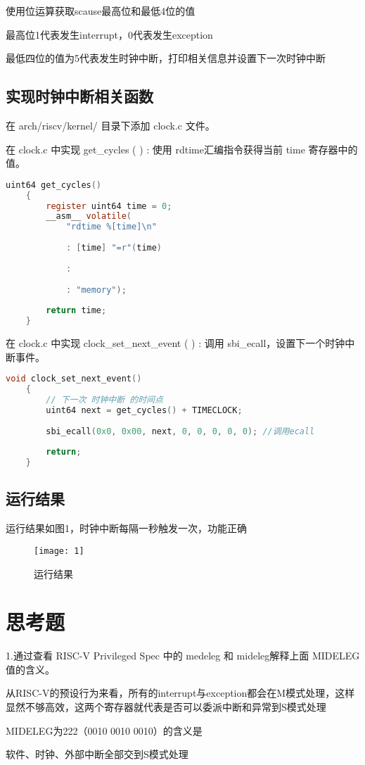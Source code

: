 \documentclass{source/Report}
\begin{document}
使用位运算获取scause最高位和最低4位的值

最高位1代表发生interrupt，0代表发生exception

最低四位的值为5代表发生时钟中断，打印相关信息并设置下一次时钟中断

\subsection{实现时钟中断相关函数}

在 arch/riscv/kernel/ 目录下添加 clock.c 文件。

在 clock.c 中实现 get\_cycles ( ) : 使用 rdtime汇编指令获得当前 time 寄存器中的值。

\begin{lstlisting}[language = c, title = {get\_cycles}]
    uint64 get_cycles()
    {
        register uint64 time = 0;
        __asm__ volatile(
            "rdtime %[time]\n"
    
            : [time] "=r"(time)
    
            :
    
            : "memory");
    
        return time;
    }
\end{lstlisting}

在 clock.c 中实现 clock\_set\_next\_event ( ) : 调用 sbi\_ecall，设置下一个时钟中断事件。

\begin{lstlisting}[language = c, title = {clock\_set\_next\_event}]
    void clock_set_next_event()
    {
        // 下一次 时钟中断 的时间点
        uint64 next = get_cycles() + TIMECLOCK;
    
        sbi_ecall(0x0, 0x00, next, 0, 0, 0, 0, 0); //调用ecall
    
        return;
    }
\end{lstlisting}

\subsection{运行结果}

运行结果如图1，时钟中断每隔一秒触发一次，功能正确

\begin{figure}[p]
    \centering
    \texttt{[image: 1]}
    \caption{运行结果}
\end{figure}


\section{思考题}

1.通过查看 RISC-V Privileged Spec 中的 medeleg 和 mideleg解释上面 MIDELEG 值的含义。

从RISC-V的预设行为来看，所有的interrupt与exception都会在M模式处理，这样显然不够高效，这两个寄存器就代表是否可以委派中断和异常到S模式处理

MIDELEG为222（0010 0010 0010）的含义是

软件、时钟、外部中断全部交到S模式处理
\end{document}
